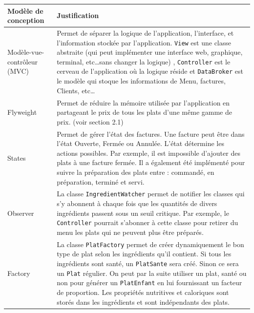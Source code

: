 \documentclass[a11paper, 11pt]{article}
\begin{document}
\begin{table}[H]
\caption{Justification des modèles de conception}
\begin{longtable}{lp{10cm}}
\toprule
\textbf{Modèle de conception} & \textbf{Justification} \\

\midrule
Modèle-vue-contrôleur (MVC) &
Permet de séparer la logique de l'application, l'interface, et l'information
stockée par l'application. \verb|View| est une classe abstraite (qui peut
implémenter une interface web, graphique, terminal, etc\ldots sans changer la
logique) , \verb|Controller| est le cerveau de l'application où la logique
réside et \verb|DataBroker| est le modèle qui stoque les informations de Menu,
factures, Clients, etc\ldots \\

\midrule

Flyweight &
Permet de réduire la mémoire utilisée par l'application en partageant le prix
de tous les plats d'une même gamme de prix. (voir section 2.1) \\

\midrule
States &
Permet de gérer l'état des factures. Une facture peut être dans l'état Ouverte,
Fermée ou Annulée. L'état détermine les actions possibles. Par exemple, il est
impossible d'ajouter des plats à une facture fermée. Il a également été
implémenté pour suivre la préparation des plats entre : commandé, en
préparation, terminé et servi.\\

\midrule
Observer &
La classe \verb|IngredientWatcher| permet de notifier les classes qui s'y
abonnent à chaque fois que les quantités de divers ingrédients passent sous un
seuil critique. Par exemple, le \verb|Controller| pourrait s'abonner à cette
classe pour retirer du menu les plats qui ne peuvent plus être préparés. \\

\midrule
Factory&
La classe \verb|PlatFactory| permet de créer dynamiquement le bon type de plat
selon les ingrédients qu'il contient. Si tous les ingrédients sont santé, un
\verb|PlatSante| sera créé. Sinon ce sera un \verb|Plat| régulier. On peut par
la suite utiliser un plat, santé ou non pour générer un \verb|PlatEnfant| en
lui fournissant un facteur de proportion. Les propriétés nutritives et
caloriques sont storés dans les ingrédients et sont indépendants des plats.\\

\midrule
\end{longtable}
\end{table}
\end{document}
